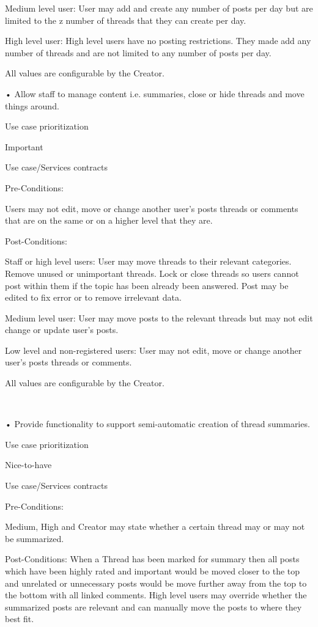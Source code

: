 \documentclass[11pt]{article}
\begin{document}
Medium level user:
User may add and create any number of posts per day but are limited to the z number of threads that they can create per day.

High level user:
High level users have no posting restrictions. They made add any number of threads and are not limited to any number of posts per day.
 
All values are configurable by the Creator.
 

•	Allow staff to manage content i.e. summaries, close or hide threads and move things around.

Use case prioritization

	Important

Use case/Services contracts

Pre-Conditions:

Users may not edit, move or change another user’s posts threads or comments that are on the same or on a higher level that they are.

Post-Conditions:

Staff or high level users:
User may move threads to their relevant categories. Remove unused or unimportant threads. Lock or close threads so users cannot post within them if the topic has been already been answered. Post may be edited to fix error or to remove irrelevant data.

Medium level user:
User may move posts to the relevant threads but may not edit change or update user’s posts.

Low level and non-registered users:
User may not edit, move or change another user’s posts threads or comments.

All values are configurable by the Creator.

 

•	Provide functionality to support semi-automatic creation of thread summaries.

Use case prioritization

	Nice-to-have

Use case/Services contracts

Pre-Conditions:

Medium, High and Creator may state whether a certain thread may or may not be summarized.

Post-Conditions:
When a Thread has been marked for summary then all posts which have been highly rated and important would be moved closer to the top and unrelated or unnecessary posts would be move further away from the top to the bottom with all linked comments. High level users may override whether the summarized posts are relevant and can manually move the posts to where they best fit.
\end{document}
